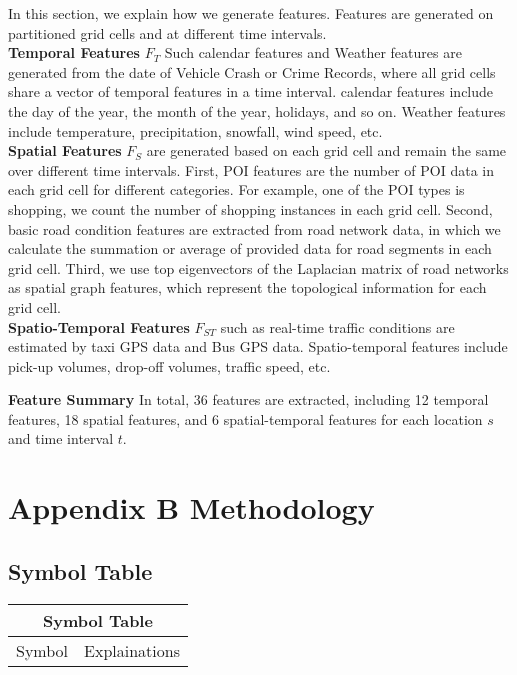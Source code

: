 \documentclass{article}
\begin{document}
{In this section, we explain how we generate features. Features are generated on partitioned grid cells and at different time intervals. \\
\textbf{Temporal Features} $F_T$ Such calendar features and Weather features are generated from the date of Vehicle Crash or Crime Records, where all grid cells share a vector of temporal features in a time interval. calendar features include the day of the year, the month of the year, holidays, and so on. Weather features include temperature, precipitation, snowfall, wind speed, etc.  \\
\textbf{Spatial Features} $F_S$ are generated based on each grid cell and remain the same over different time intervals. First, POI features are the number of POI data in each grid cell for different categories. For example, one of the POI types is shopping, we count the number of shopping instances in each grid cell. Second, basic road condition features are extracted from road network data, in which we calculate the summation or average of provided data for road segments in each grid cell. Third, we use top eigenvectors of the Laplacian matrix of road networks as spatial graph features\cite{yuan2018hetero}, which represent the topological information for each grid cell. \\
\textbf{Spatio-Temporal Features} $F_{ST}$ such as real-time traffic conditions are estimated by taxi GPS data and Bus GPS data. Spatio-temporal features include pick-up volumes, drop-off volumes, traffic speed, etc.

\textbf{Feature Summary} In total, 36 features are extracted, including 12 temporal features, 18 spatial features, and 6 spatial-temporal features for each location $s$ and time interval $t$.

\section{Appendix B  Methodology}

\subsection{Symbol Table}
\setlength{\extrarowheight}{.5em}
\begin{tabular}{ |p{2cm}|p{9cm}|  }
\hline
\multicolumn{2}{|c|}{Symbol Table} \\
\hline
Symbol & Explainations \\


\end{tabular}}
\end{document}
